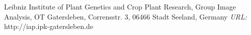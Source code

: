 % 


\vfill
\small{Leibniz Institute of Plant Genetics and Crop Plant Research, Group Image Analysis, OT Gatersleben, Corrensstr. 3, 06466 Stadt Seeland, Germany}
\newline
\small{\textit{URL:} http://iap.ipk-gatersleben.de}
